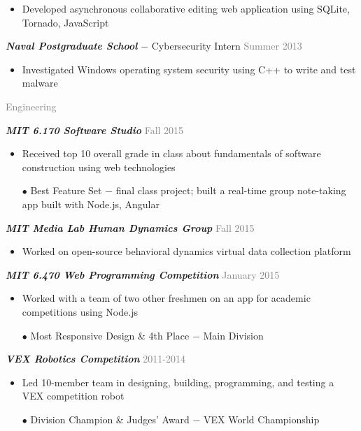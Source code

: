 \documentclass[11pt]{article}
\newcommand{\rsection}[1]{\vspace{1.5em}\textcolor{gray}{\Large \robotoslab #1}\vspace{0.5em}}
\newcommand{\bt}[1]{\textit{\textbf{#1}}} %
\newcommand{\gap}[0]{\vspace{0.5em}} %
\newcommand{\dash}[0]{ $-$ } %
\newcommand{\gray}[1]{\textcolor{gray}{#1}}
\begin{document}
\begin{itemize}
\item Developed asynchronous collaborative editing web application using SQLite, Tornado, JavaScript
\end{itemize}

\gap

\bt{Naval Postgraduate School}\dash Cybersecurity Intern \hfill \gray{Summer 2013}

\begin{itemize}
\item Investigated Windows operating system security using C++ to write and test malware
\end{itemize}

\rsection{Engineering}

\bt{MIT 6.170 Software Studio} \hfill \gray{Fall 2015}

\begin{itemize}
\item Received top 10 overall grade in class about fundamentals of software construction using web technologies
\item[$\bullet$] Best Feature Set\dash final class project; built a real-time group note-taking app built with Node.js, Angular
\end{itemize}

\gap

\bt{MIT Media Lab Human Dynamics Group} \hfill \gray{Fall 2015}

\begin{itemize}
\item Worked on open-source behavioral dynamics virtual data collection platform
\end{itemize}

\gap

\bt{MIT 6.470 Web Programming Competition} \hfill \gray{January 2015}

\begin{itemize}
\item Worked with a team of two other freshmen on an app for academic competitions using Node.js
\item[$\bullet$] Most Responsive Design \& 4th Place\dash Main Division
\end{itemize}

\gap

\bt{VEX Robotics Competition} \hfill \gray{2011-2014}

\begin{itemize}
\item Led 10-member team in designing, building, programming, and testing a VEX competition robot
\item[$\bullet$] Division Champion \& Judges' Award\dash VEX World Championship
\end{itemize}
\end{document}

